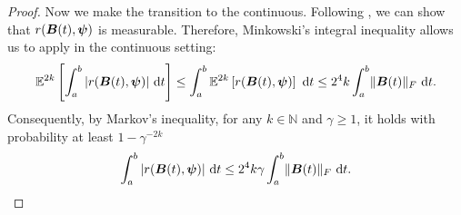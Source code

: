 \documentclass[12pt]{article}
\begin{document}
\begin{proof}
    Now we make the transition to the continuous. Following \cite{kressner-2023-randomized-lowrank}, we can show that $r(\boldsymbol{B}(t), \boldsymbol{\psi})$ is measurable. Therefore, Minkowski's integral inequality \cite[theorem 202]{hardy-1952-inequalities} allows us to apply  in the continuous setting: 
    \begin{equation}
        \mathbb{E}^{2 k}\left[ \int_{a}^{b} |r(\boldsymbol{B}(t), \boldsymbol{\psi})|~\mathrm{d}t  \right]
        \leq \int_{a}^{b} \mathbb{E}^{2 k}\left[ r(\boldsymbol{B}(t), \boldsymbol{\psi}) \right]~\mathrm{d}t
        \leq 2^4 k \int_{a}^{b} \lVert \boldsymbol{B}(t) \rVert _F~\mathrm{d}t.
    \end{equation}
    Consequently, by Markov's inequality, for any $k \in \mathbb{N}$ and $\gamma \geq 1$, it holds with probability at least $1 - \gamma^{-2 k}$
    \begin{equation}
        \int_{a}^{b} |r(\boldsymbol{B}(t), \boldsymbol{\psi})|~\mathrm{d}t \leq 2^4 k \gamma \int_{a}^{b} \lVert \boldsymbol{B}(t) \rVert _F~\mathrm{d}t.
        \label{equ:hutchinson-trace-onequery-uniform}
    \end{equation}


\end{proof}
\end{document}
